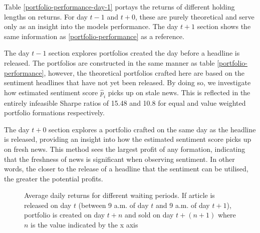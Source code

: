 Table \ref{portfolio-performance-day-1} portays the returns of different holding lengths on returns. For day $t-1$ and $t+0$, these are purely theoretical and serve only as an insight into the models performance. The day $t+1$ section shows the same information as \ref{portfolio-performance} as a reference.

The day $t-1$ section explores portfolios created the day before a headline is released. The portfolios are constructed in the same manner as table \ref{portfolio-performance}, however, the theoretical portfolios crafted here are based on the sentiment headlines that have not yet been released. By doing so, we investigate how estimated sentiment score $\widehat p_i$ picks up on stale news. This is reflected in the entirely infeasible Sharpe ratios of 15.48 and 10.8 for equal and value weighted portfolio formations respectively.

The day $t + 0$ section explores a portfolio crafted on the same day as the headline is released, providing an insight into how the estimated sentiment score picks up on fresh news. This method sees the largest profit of any formation, indicating that the freshness of news is significant when observing sentiment. In other words, the closer to the release of a headline that the sentiment can be utilised, the greater the potential profits.
\begin{figure}[!ht]
      \centering
{}
\caption[Graph of average daily returns for different waiting periods]{Average daily returns for different waiting periods. If article is released on day $t$ (between 9 a.m. of day $t$ and 9 a.m. of day $t+1$), portfolio is created on day $t+n$ and sold on day $t+(n+1)$ where $n$ is the value indicated by the x axis}
\label{fig:speed-assimilation}
\end{figure}

